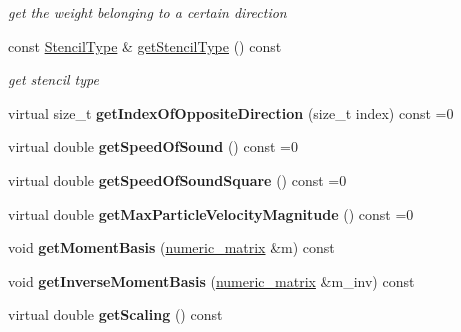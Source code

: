 \begin{DoxyCompactItemize}
\begin{DoxyCompactList}\small\item\em get the weight belonging to a certain direction \item\end{DoxyCompactList}\item 
const \hyperlink{namespacenatrium_a45d5dacaf5eb5efde670179d949173ba}{StencilType} \& \hyperlink{classnatrium_1_1Stencil_af4dbee6d83d5d749f02f771633d54db2}{getStencilType} () const 
\begin{DoxyCompactList}\small\item\em get stencil type \item\end{DoxyCompactList}\item 
\hypertarget{classnatrium_1_1Stencil_ac63de1be258c896319cb2c6dba515270}{
virtual size\_\-t {\bfseries getIndexOfOppositeDirection} (size\_\-t index) const =0}
\label{classnatrium_1_1Stencil_ac63de1be258c896319cb2c6dba515270}

\item 
\hypertarget{classnatrium_1_1Stencil_af2d6d874693082b4862c5dfa1c3eea59}{
virtual double {\bfseries getSpeedOfSound} () const =0}
\label{classnatrium_1_1Stencil_af2d6d874693082b4862c5dfa1c3eea59}

\item 
\hypertarget{classnatrium_1_1Stencil_ade22cd249828046d828b9e8f9ee63b6e}{
virtual double {\bfseries getSpeedOfSoundSquare} () const =0}
\label{classnatrium_1_1Stencil_ade22cd249828046d828b9e8f9ee63b6e}

\item 
\hypertarget{classnatrium_1_1Stencil_a4ad65f3c998ac0a7242fa80bb440d38c}{
virtual double {\bfseries getMaxParticleVelocityMagnitude} () const =0}
\label{classnatrium_1_1Stencil_a4ad65f3c998ac0a7242fa80bb440d38c}

\item 
\hypertarget{classnatrium_1_1Stencil_a44d2b95f02b22b275332c5f3899b44ff}{
void {\bfseries getMomentBasis} (\hyperlink{namespacenatrium_ad8cbec7aab93a74837b06ded39615d47}{numeric\_\-matrix} \&m) const }
\label{classnatrium_1_1Stencil_a44d2b95f02b22b275332c5f3899b44ff}

\item 
\hypertarget{classnatrium_1_1Stencil_a0a90a42c687b2dfdd485e31e815e0668}{
void {\bfseries getInverseMomentBasis} (\hyperlink{namespacenatrium_ad8cbec7aab93a74837b06ded39615d47}{numeric\_\-matrix} \&m\_\-inv) const }
\label{classnatrium_1_1Stencil_a0a90a42c687b2dfdd485e31e815e0668}

\item 
\hypertarget{classnatrium_1_1Stencil_aa4b312a36671c30499d129bb91052f8c}{
virtual double {\bfseries getScaling} () const }
\label{classnatrium_1_1Stencil_aa4b312a36671c30499d129bb91052f8c}

\end{DoxyCompactItemize}


